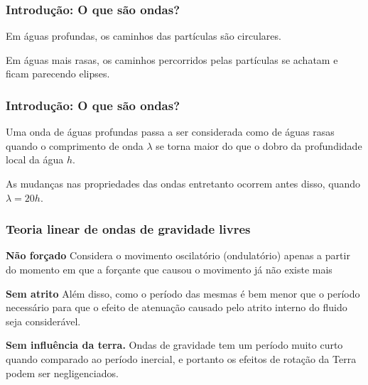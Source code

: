 \begin{frame}
\frametitle{Introdução: O que são ondas?}
    \begin{block}{}
      Em águas profundas, os caminhos das partículas são circulares.
    \end{block}

    \begin{block}{}
      Em águas mais rasas, os caminhos percorridos pelas partículas se achatam e
      ficam parecendo elipses.
    \end{block}
\end{frame}


\begin{frame}
\frametitle{Introdução: O que são ondas?}
  \begin{block}{}
    Uma onda de águas profundas passa a ser considerada
    como de águas rasas quando o comprimento de onda $\lambda$ se torna maior
    do que o dobro da profundidade local da água $h$.
  \end{block}

  \begin{block}{}
    As mudanças nas propriedades das ondas entretanto ocorrem antes disso,
    quando $\lambda = 20 h$.
  \end{block}
\end{frame}


\begin{frame}
\frametitle{Teoria linear de ondas de gravidade livres}
\scriptsize{
    \begin{block}{{\bf Não forçado}}
        Considera o movimento oscilatório (ondulatório) apenas a partir do
        momento em que a forçante que causou o movimento já não existe mais
    \end{block}

    \pause
    \begin{block}{{\bf Sem atrito}}
        Além disso, como o período das mesmas é bem menor que o período
        necessário para que o efeito de atenuação causado pelo atrito interno
        do fluido seja considerável.
    \end{block}

    \pause
    \begin{block}{{\bf Sem influência da terra.}}
        Ondas de gravidade tem um período muito curto quando comparado ao
        período inercial, e portanto os efeitos de rotação da Terra podem ser
        negligenciados.
    \end{block}
}
\end{frame}

